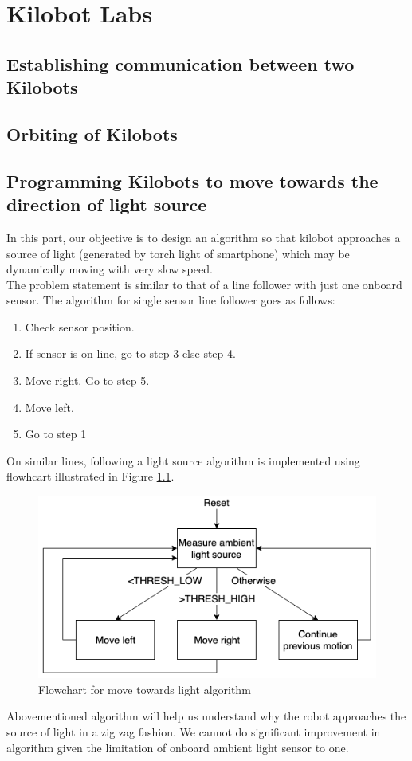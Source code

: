 \documentclass{report}[12pt]
\begin{document}
\chapter{Kilobot Labs}

\section{Establishing communication between two Kilobots}

\section{Orbiting of Kilobots}

\section{Programming Kilobots to move towards the direction of light source}
In this part, our objective is to design an algorithm so that kilobot approaches a source of light (generated by torch light of smartphone) which may be dynamically moving with very slow speed.\\
The problem statement is similar to that of a line follower with just one onboard sensor. The algorithm for single sensor line follower goes as follows:
\begin{enumerate}
	\item Check sensor position.
	\item If sensor is on line, go to step 3 else step 4.
	\item Move right. Go to step 5.
	\item Move left.
	\item Go to step 1
\end{enumerate}
On similar lines, following a light source algorithm is implemented using flowhcart illustrated in Figure \ref{fig:move_towards_light_algorithm}.
\begin{figure}[H]
	\centering
	\includegraphics[scale=0.5]{images/move_towards_light_algorithm}
	\caption{Flowchart for move towards light algorithm}
	\label{fig:move_towards_light_algorithm}
\end{figure}
Abovementioned algorithm will help us understand why the robot approaches the source of light in a zig zag fashion. We cannot do significant improvement in algorithm given the limitation of onboard ambient light sensor to one.
\end{document}

